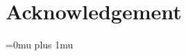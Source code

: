 \documentclass[journal,compsoc]{IEEEtran}
\begin{document}
%
\section{Acknowledgement}
\Urlmuskip=0mu plus 1mu\relax
\renewcommand{\bibfont}{\footnotesize}

%
%

\end{document}
